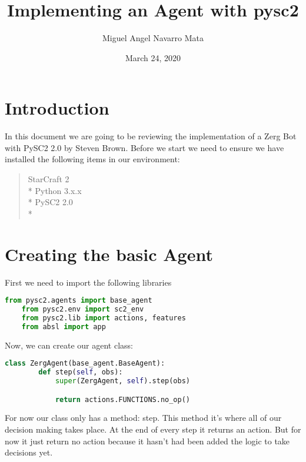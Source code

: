 \documentclass[11pt]{report}            %
\title{\bf Implementing an Agent with pysc2}  %
\author{Miguel Angel Navarro Mata}              %
\date{March 24, 2020}                           %
\begin{document}
\maketitle                              %
\setcounter{page}{2}                    %
\tableofcontents                        %

\newpage
\chapter{Introduction}
In this document we are going to be reviewing the implementation of a Zerg Bot with PySC2 2.0 by Steven Brown.
Before we start we need to ensure we have installed the following items in our environment:
\begin{quote}
StarCraft 2 \\*
Python 3.x.x \\*
PySC2 2.0 \\*
\end{quote}

\chapter{Creating the basic Agent}
First we need to import the following libraries
\begin{lstlisting}[language=Python]
    from pysc2.agents import base_agent
    from pysc2.env import sc2_env
    from pysc2.lib import actions, features
    from absl import app
\end{lstlisting}

Now, we can create our agent class:
\begin{lstlisting}[language=Python]
    class ZergAgent(base_agent.BaseAgent):
        def step(self, obs):
            super(ZergAgent, self).step(obs)

            return actions.FUNCTIONS.no_op()
\end{lstlisting}
For now our class only has a method: step. This method it's where all of our decision making takes place. At the end of every step it returns an action. But for now it just return no action because it hasn't had been added the logic to take decisions yet.
\end{document}
